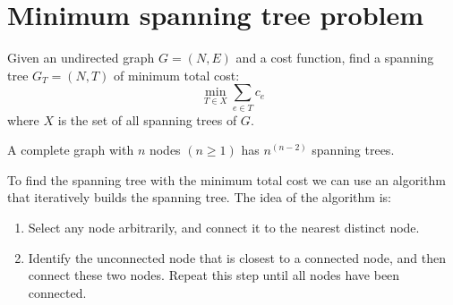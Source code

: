 \documentclass[12pt, a4paper]{report}
\begin{document}
    \section{Minimum spanning tree problem}
    Given an undirected graph $G=(N,E)$ and a cost function, find a spanning tree $G_T=(N,T)$ of minimum total cost: 
    \[\min_{T \in X} \sum_{e \in T}c_e\]
    where $X$ is the set of all spanning trees of $G$. 
    \begin{theorem}
        A complete graph with $n$ nodes $(n \geq 1)$ has $n^{(n-2)}$ spanning trees. 
    \end{theorem}
    To find the spanning tree with the minimum total cost we can use an algorithm that iteratively builds the spanning tree. The idea of the algorithm is: 
    \begin{enumerate}
        \item Select any node arbitrarily, and connect it to the nearest distinct node.
        \item Identify the unconnected node that is closest to a connected node, and then connect these two nodes. Repeat this step until all nodes have been connected.
    \end{enumerate}
\end{document}
